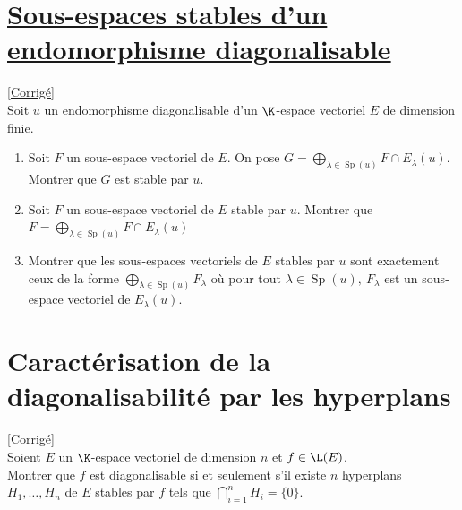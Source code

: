 \documentclass[8pt]{book}
\begin{document}
	\section{\underline{Sous-espaces stables d'un endomorphisme diagonalisable} }
	\label{Sous-espaces stables d'un endomorphisme diagonalisable}
	\textcolor{blue}{\hyperref[Sous-espaces stables d'un endomorphisme diagonalisable corrigé]{[Corrigé]}}\\
	Soit $u$ un endomorphisme diagonalisable d'un $\K$-espace vectoriel $E$ de dimension finie.
	\begin{enumerate}[leftmargin=*]
		\item Soit $F$ un sous-espace vectoriel de $E$. On pose $G=\displaystyle\bigoplus\limits_{\lambda\in \operatorname{Sp}(u)}{F\cap E_\lambda(u)}$.\\
		Montrer que $G$ est stable par $u$.
		\item Soit $F$ un sous-espace vectoriel de $E$ stable par $u$. Montrer que $F=\displaystyle\bigoplus\limits_{\lambda\in \operatorname{Sp}(u)}{F\cap E_\lambda(u)}$
		\item Montrer que les sous-espaces vectoriels de $E$ stables par $u$ sont exactement ceux de la forme $\displaystyle\bigoplus\limits_{\lambda\in \operatorname{Sp}(u)}{F_\lambda}$ où pour tout $\lambda\in \operatorname{Sp}(u),\ F_\lambda$ est un sous-espace vectoriel de $E_\lambda(u)$.\\
	\end{enumerate}
	
	\section{Caractérisation de la diagonalisabilité par les hyperplans }
	\label{Caractérisation de la diagonalisabilité par les hyperplans}
	\textcolor{blue}{\hyperref[Caractérisation de la diagonalisabilité par les hyperplans corrigé]{[Corrigé]}}\\
	Soient $E$ un $\K$-espace vectoriel de dimension $n$ et $f\in \L(E)$.\\
	Montrer que $f$ est diagonalisable si et seulement s'il existe $n$ hyperplans $H_1,\dots,H_n$ de $E$ stables par $f$ tels que $\displaystyle\bigcap\limits_{i=1}^n{H_i}=\{0\}$.
	
\end{document}
